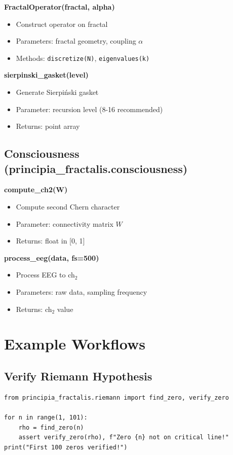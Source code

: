 \textbf{FractalOperator(fractal, alpha)}
\begin{itemize}
\item Construct operator on fractal
\item Parameters: fractal geometry, coupling $\alpha$
\item Methods: \texttt{discretize(N)}, \texttt{eigenvalues(k)}
\end{itemize}

\textbf{sierpinski\_gasket(level)}
\begin{itemize}
\item Generate Sierpiński gasket
\item Parameter: recursion level (8-16 recommended)
\item Returns: point array
\end{itemize}

\subsection{Consciousness (principia\_fractalis.consciousness)}

\textbf{compute\_ch2(W)}
\begin{itemize}
\item Compute second Chern character
\item Parameter: connectivity matrix $W$
\item Returns: float in [0, 1]
\end{itemize}

\textbf{process\_eeg(data, fs=500)}
\begin{itemize}
\item Process EEG to ch$_2$
\item Parameters: raw data, sampling frequency
\item Returns: ch$_2$ value
\end{itemize}

\section{Example Workflows}

\subsection{Verify Riemann Hypothesis}

\begin{verbatim}
from principia_fractalis.riemann import find_zero, verify_zero

for n in range(1, 101):
    rho = find_zero(n)
    assert verify_zero(rho), f"Zero {n} not on critical line!"
print("First 100 zeros verified!")
\end{verbatim}

